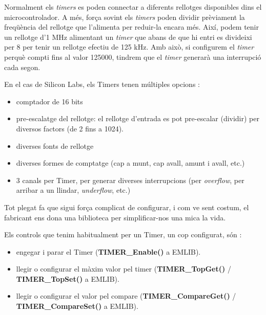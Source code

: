 Normalment els {\em timers} es poden connectar a diferents rellotges disponibles dins el microcontrolador. A més, força sovint els {\em timers} poden dividir prèviament la freqüència del rellotge que l'alimenta per reduir-la encara més. Així, podem tenir un rellotge d'1 MHz alimentant un {\em timer} que abans de que hi entri es divideixi per 8 per tenir un rellotge efectiu de 125 kHz. Amb això, si configurem el {\em timer} perquè compti fins al valor 125000, tindrem que el {\em timer} generarà una interrupció cada segon.

En el cas de Silicon Labs, els Timers tenen múltiples opcions \cite[249]{EFM32GRM}:

\begin{itemize}
 \item comptador de 16 bits
 \item pre-escalatge del rellotge: el rellotge d'entrada es pot pre-escalar (dividir) per diversos factors (de 2 fins a 1024).
 \item diverses fonts de rellotge
 \item diverses formes de comptatge (cap a munt, cap avall, amunt i avall, etc.)
 \item 3 canals per Timer, per generar diverses interrupcions (per {\em overflow}, per arribar a un llindar, {\em underflow}, etc.)
\end{itemize}



Tot plegat fa que sigui força complicat de configurar, i com ve sent costum, el fabricant ens dona una biblioteca per simplificar-nos una mica la vida.

Els controls que tenim habitualment per un Timer, un cop configurat, són \cite{EMLIB}:

\begin{itemize}
 \item engegar i parar el Timer ({\bf TIMER\_Enable()} a EMLIB).
 \item llegir o configurar el màxim valor pel timer ({\bf TIMER\_TopGet()} / {\bf TIMER\_TopSet()} a EMLIB).
 \item llegir o configurar el valor pel compare ({\bf TIMER\_CompareGet()} / {\bf TIMER\_CompareSet()} a EMLIB).
\end{itemize}

